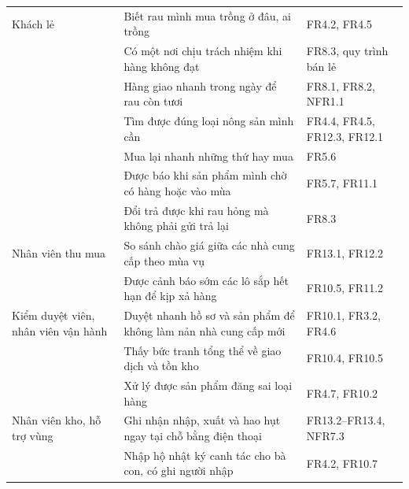 \begin{longtable}{L{2.81cm} L{8.85cm} L{3.24cm}}
Khách lẻ & Biết rau mình mua trồng ở đâu, ai trồng & FR4.2, FR4.5 \\
& Có một nơi chịu trách nhiệm khi hàng không đạt & FR8.3, quy trình bán lẻ \\
& Hàng giao nhanh trong ngày để rau còn tươi & FR8.1, FR8.2, NFR1.1 \\
& Tìm được đúng loại nông sản mình cần & FR4.4, FR4.5, FR12.3, FR12.1 \\
& Mua lại nhanh những thứ hay mua & FR5.6 \\
& Được báo khi sản phẩm mình chờ có hàng hoặc vào mùa & FR5.7, FR11.1 \\
& Đổi trả được khi rau hỏng mà không phải gửi trả lại & FR8.3 \\
Nhân viên thu mua & So sánh chào giá giữa các nhà cung cấp theo mùa vụ & FR13.1, FR12.2 \\
& Được cảnh báo sớm các lô sắp hết hạn để kịp xả hàng & FR10.5, FR11.2 \\
Kiểm duyệt viên, nhân viên vận hành & Duyệt nhanh hồ sơ và sản phẩm để không làm nản nhà cung cấp mới & FR10.1, FR3.2, FR4.6 \\
& Thấy bức tranh tổng thể về giao dịch và tồn kho & FR10.4, FR10.5 \\
& Xử lý được sản phẩm đăng sai loại hàng & FR4.7, FR10.2 \\
Nhân viên kho, hỗ trợ vùng & Ghi nhận nhập, xuất và hao hụt ngay tại chỗ bằng điện thoại & FR13.2--FR13.4, NFR7.3 \\
& Nhập hộ nhật ký canh tác cho bà con, có ghi người nhập & FR4.2, FR10.7 \\
\end{longtable}
\endgroup


